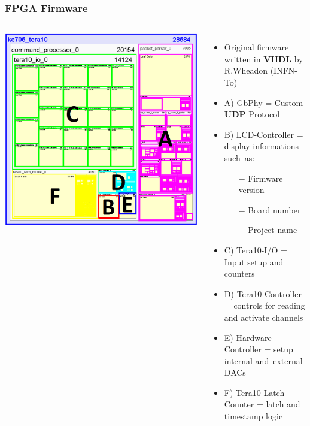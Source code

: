 \documentclass[aspectratio=169]{beamer}
\begin{document}
	\begin{frame}
		\frametitle{FPGA Firmware}
		\begin{columns}
			\begin{center}
				\includegraphics[width=0.9 \textwidth]{IMG2/HIERARCHY5}
			\end{center}
			\begin{itemize}
				\item Original firmware written in \textbf{VHDL} by R.Wheadon (INFN-To) 
				\item A) GbPhy = Custom \textbf{UDP} Protocol
				\item B) LCD-Controller = display informations such~as:
					\begin{itemize}
						\item[$-$] Firmware version
						\item[$-$] Board number
						\item[$-$] Project name
					\end{itemize}
				\item C) Tera10-I/O = Input setup and counters
				\item D) Tera10-Controller = controls for reading and activate channels
				\item E) Hardware-Controller = setup internal and~external DACs
				\item F) Tera10-Latch-Counter = latch and timestamp logic
			\end{itemize}
		\end{columns}
	\end{frame}
\end{document}

